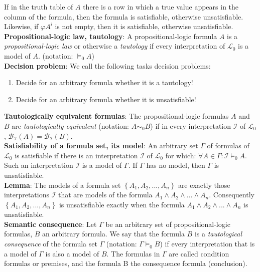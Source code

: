 \documentclass[margin=0px]{article}
\begin{document}
If in the truth table of $A$ there is a row in which a true value appears in the column of the formula, then the formula is satisfiable, otherwise unsatisfiable. Likewise, if $\varphi A^{i}$ is not empty, then it is satisfiable, otherwise unsatisfiable.\\

\noindent \textbf{Propositional-logic law, tautology}: A propositional-logic formula $A$ is a \textit{propositional-logic law} or otherwise a \textit{tautology} if every interpretation of $\mathcal{L}_{0}$ is a model of $A$. (notation: $\models_{0} A$)\\

\noindent \textbf{Decision problem}: We call the following tasks decision problems:
\begin{enumerate}
    \item	Decide for an arbitrary formula whether it is a tautology!

    \item	Decide for an arbitrary formula whether it is unsatisfiable!
\end{enumerate}

\noindent \textbf{Tautologically equivalent formulas}: The propositional-logic formulas $A$ and $B$ are \textit{tautologically equivalent} (notation: $A \sim _{0} B$) if in every interpretation $\mathcal{I}$ of $\mathcal{L}_{0}$, $\mathcal{B}_{\mathcal{I}}(A)=\mathcal{B}_{\mathcal{I}}(B)$.\\

\noindent \textbf{Satisfiability of a formula set, its model}: An arbitrary set $\Gamma$ of formulas of $\mathcal{L}_{0}$ is
satisfiable if there is an interpretation $\mathcal{I}$ of $\mathcal{L}_{0}$ for which: $\forall A \in \Gamma: \mathcal{I} \models_{0} A$.
Such an interpretation $\mathcal{I}$ is a model of $\Gamma$. If $\Gamma$ has no model, then $\Gamma$ is unsatisfiable.\\

\noindent \textbf{Lemma}: The models of a formula set $\left\{A_{1},A_{2},...,A_{n}\right\}$ are exactly those interpretations $\mathcal{I}$
that are models of the formula $A_{1} \wedge A_{2} \wedge ... \wedge A_{n}$. Consequently $\left\{A_{1},A_{2},...,A_{n}\right\}$
is unsatisfiable exactly when the formula $A_{1} \wedge A_{2} \wedge ... \wedge A_{n}$ is unsatisfiable.\\

\noindent \textbf{Semantic consequence}: Let $\Gamma$ be an arbitrary set of propositional-logic formulas, $B$ an arbitrary formula.
We say that the formula $B$ is a \textit{tautological consequence} of the formula set $\Gamma$ (notation: $\Gamma \models_{0} B$) if every interpretation that is a model of $\Gamma$ is also a model of $B$. The formulas in $\Gamma$ are called condition formulas or premises,
and the formula B the consequence formula (conclusion).\\
\end{document}
